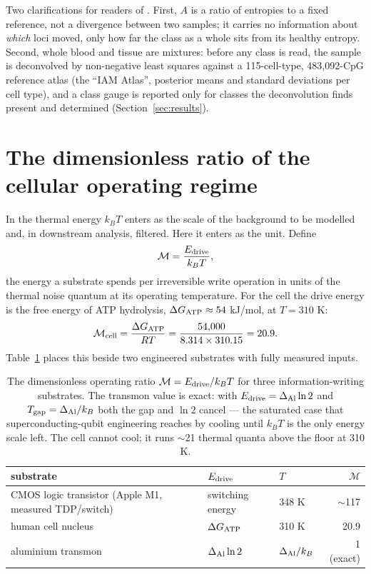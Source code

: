\documentclass[12pt,a4paper]{article}
\begin{document}
Two clarifications for readers of \citep{sanchez2016}. First, $A$ is a ratio of entropies to a fixed reference, not a divergence between two samples; it carries no information about \emph{which} loci moved, only how far the class as a whole sits from its healthy entropy. Second, whole blood and tissue are mixtures: before any class is read, the sample is deconvolved by non-negative least squares against a 115-cell-type, 483,092-CpG reference atlas (the ``IAM Atlas'', posterior means and standard deviations per cell type), and a class gauge is reported only for classes the deconvolution finds present and determined (Section~\ref{sec:results}).

\section{The dimensionless ratio of the cellular operating regime}
\label{sec:mahaffey}

In \citep{sanchez2016} the thermal energy $k_B T$ enters as the scale of the background to be modelled and, in downstream analysis, filtered. Here it enters as the unit. Define
\begin{equation}
\mathcal{M} = \frac{E_{\rm drive}}{k_B T},
\label{eq:M}
\end{equation}
the energy a substrate spends per irreversible write operation in units of the thermal noise quantum at its operating temperature. For the cell the drive energy is the free energy of ATP hydrolysis, $\Delta G_{\rm ATP}\approx 54$ kJ/mol, at $T = 310$ K:
\begin{equation}
\mathcal{M}_{\rm cell} = \frac{\Delta G_{\rm ATP}}{RT} = \frac{54{,}000}{8.314\times 310.15} = 20.9 .
\end{equation}
Table~\ref{tab:M} places this beside two engineered substrates with fully measured inputs.

\begin{table}[H]
\centering\small
\caption{The dimensionless operating ratio $\mathcal{M} = E_{\rm drive}/k_B T$ for three information-writing substrates. The transmon value is exact: with $E_{\rm drive} = \Delta_{\rm Al}\ln 2$ and $T_{\rm gap} = \Delta_{\rm Al}/k_B$ both the gap and $\ln 2$ cancel --- the saturated case that superconducting-qubit engineering reaches by cooling until $k_B T$ is the only energy scale left. The cell cannot cool; it runs $\sim$21 thermal quanta above the floor at 310 K.}
\label{tab:M}
\begin{tabular}{lllr}
\toprule
substrate & $E_{\rm drive}$ & $T$ & $\mathcal{M}$\\
\midrule
CMOS logic transistor (Apple M1, measured TDP/switch) & switching energy & 348 K & $\sim$117\\
human cell nucleus & $\Delta G_{\rm ATP}$ & 310 K & 20.9\\
aluminium transmon & $\Delta_{\rm Al}\ln 2$ & $\Delta_{\rm Al}/k_B$ & 1 (exact)\\
\bottomrule
\end{tabular}
\end{table}
\end{document}
